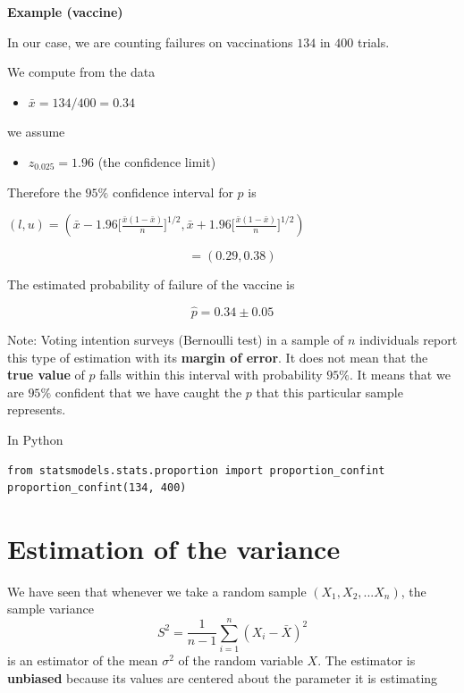 \documentclass[
]{book}
\providecommand{\tightlist}{%
  \setlength{\itemsep}{0pt}\setlength{\parskip}{0pt}}
\begin{document}
\textbf{Example (vaccine)}

In our case, we are counting failures on vaccinations \(134\) in \(400\) trials.

We compute from the data

\begin{itemize}
\tightlist
\item
  \(\bar{x}=134/400=0.34\)
\end{itemize}

we assume

\begin{itemize}
\tightlist
\item
  \(z_{0.025}=1.96\) (the confidence limit)
\end{itemize}

Therefore the \(95\%\) confidence interval for \(p\) is

\((l,u)=(\bar{x}-1.96 \big[\frac{\bar{x}(1-\bar{x})}{n} \big]^{1/2}, \bar{x}+1.96 \big[\frac{\bar{x}(1-\bar{x})}{n} \big]^{1/2})\)

\[=(0.29,0.38)\]

The estimated probability of failure of the vaccine is

\[\hat{p}=0.34 \pm 0.05\]

Note: Voting intention surveys (Bernoulli test) in a sample of \(n\) individuals report this type of estimation with its \textbf{margin of error}. It does not mean that the \textbf{true value} of \(p\) falls within this interval with probability \(95\%\). It means that we are \(95\%\) confident that we have caught the \(p\) that this particular sample represents.

In Python

\begin{verbatim}
from statsmodels.stats.proportion import proportion_confint
proportion_confint(134, 400)
\end{verbatim}

\hypertarget{estimation-of-the-variance}{%
\section{Estimation of the variance}\label{estimation-of-the-variance}}

We have seen that whenever we take a random sample \((X_1, X_2, ... X_n)\), the sample variance
\[S^2=\frac{1}{n-1}\sum_{i=1}^n (X_i-\bar{X})^2\]
is an estimator of the mean \(\sigma^2\) of the random variable \(X\). The estimator is \textbf{unbiased} because its values are centered about the parameter it is estimating
\end{document}

